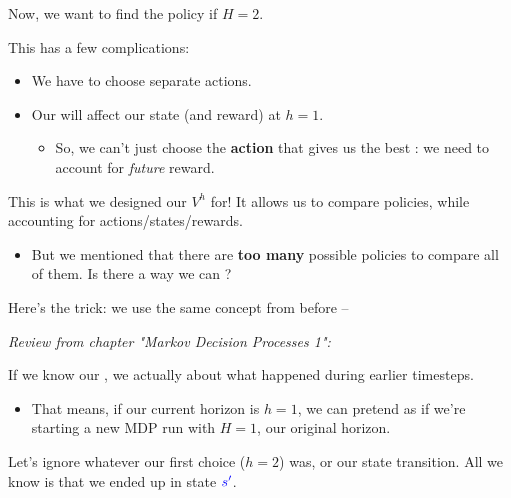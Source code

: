         Now, we want to find the policy if $H=2$.

        This has a few complications:

        \begin{itemize}
            \item We have to choose  separate actions.
            
            \item Our  will affect our state (and reward) at $h=1$.
                \begin{itemize}
                    \item So, we can't just choose the \textbf{action} that gives us the best : we need to account for \textit{future} reward.
                \end{itemize}
        \end{itemize}

        \subsecdiv


        This is what we designed our  $V^h$ for! It allows us to compare policies, while accounting for  actions/states/rewards.

        \begin{itemize}
            \item But we mentioned that there are \textbf{too many} possible policies to compare all of them. Is there a way we can ?
        \end{itemize} 

        Here's the trick: we use the same concept from before --\\

        \begin{concept}
            \textit{Review from chapter "Markov Decision Processes 1":}
            
            If we know our , we actually  about what happened during earlier timesteps.

            \begin{itemize}
                \item That means, if our current horizon is $h=1$, we can pretend as if we're starting a new MDP run with $H=1$,  our original horizon.
            \end{itemize}
        \end{concept}

        Let's ignore whatever our first choice ($h=2$) was, or our state transition. All we know is that we ended up in state $\textcolor{blue}{s'}$.


